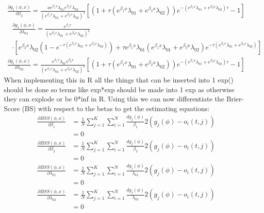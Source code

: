 \documentclass[11pt]{article}
\begin{document}
\begin{align*}
\frac{\partial g_1(\phi,x)}{\partial\beta_2} =\frac{xe^{\beta_1x}\lambda_{01}e^{\beta_2x}\lambda_{02}}{(e^{\beta_1x}\lambda_{01}+e^{\beta_2x}\lambda_{02})^2}\left[(1+\tau(e^{\beta_1x}\lambda_{01}+e^{\beta_2x}\lambda_{02}))e^{-(e^{\beta_1x}\lambda_{01}+e^{\beta_2x}\lambda_{02})\tau}-1\right]
\end{align*}
\begin{align*}
&\frac{\partial g_1(\phi,x)}{\partial \lambda_{01}}
=\frac{e^{\beta_1 x}}{\left(e^{\beta_1 x}\lambda_{01}+e^{\beta_2 x}\lambda_{02}\right)^2}\\
&\cdot\left[e^{\beta_2 x}\lambda_{02}\left(1-e^{-\tau\left(e^{\beta_1 x}\lambda_{01}+e^{\beta_2 x}\lambda_{02}\right)}\right)+\tau e^{\beta_1x}\lambda_{01}\left(e^{\beta_1 x}\lambda_{01}+e^{\beta_2 x}\lambda_{02}\right)e^{-\tau\left(e^{\beta_1 x}\lambda_{01}+e^{\beta_2 x}\lambda_{02}\right)}\right]
\end{align*}
\begin{align*}
\frac{\partial g_1(\phi,x)}{\partial\lambda_{02}} = \frac{e^{\beta_1x}\lambda_{01}e^{\beta_2x}}{(e^{\beta_1x}\lambda_{01}+e^{\beta_2x}\lambda_{02})^2}\left[(1+\tau(e^{\beta_1x}\lambda_{01}+e^{\beta_2x}\lambda_{02}))e^{-(e^{\beta_1x}\lambda_{01}+e^{\beta_2x}\lambda_{02})\tau}-1\right]
\end{align*}
When implementing this in R all the things that can be inserted into 1 exp() should be done so terms like exp*exp should be made into 1 exp as otherwise they can explode or be 0*inf in R. Using this we can now differentiate the Brier-Score (BS) with respect to the betas to get the estimating equations:
\begin{align*}
\frac{\partial BSS(\phi,x)}{\partial\beta_1} &=\frac{1}{N}\sum_{j = 1}^K\sum_{i = 1}^N \frac{dg_j(\phi)}{\beta_1}2(g_j(\phi)-o_i(t,j))\\
&= 0
\end{align*}
\begin{align*}
\frac{\partial BSS(\phi,x)}{\partial\beta_2} &=\frac{1}{N}\sum_{j = 1}^K\sum_{i = 1}^N \frac{dg_j(\phi)}{\beta_2}2(g_j(\phi)-o_i(t,j))\\
&= 0
\end{align*}
\begin{align*}
\frac{\partial BSS(\phi,x)}{\partial\lambda_{01}} &=\frac{1}{N}\sum_{j = 1}^K\sum_{i = 1}^N \frac{dg_j(\phi)}{\lambda_{01}}2(g_j(\phi)-o_i(t,j))\\
&= 0
\end{align*}
\begin{align*}
\frac{\partial BSS(\phi,x)}{\partial\lambda_{02}} &=\frac{1}{N}\sum_{j = 1}^K\sum_{i = 1}^N \frac{dg_j(\phi)}{\lambda_{02}}2(g_j(\phi)-o_i(t,j))\\
&= 0
\end{align*}
\end{document}
